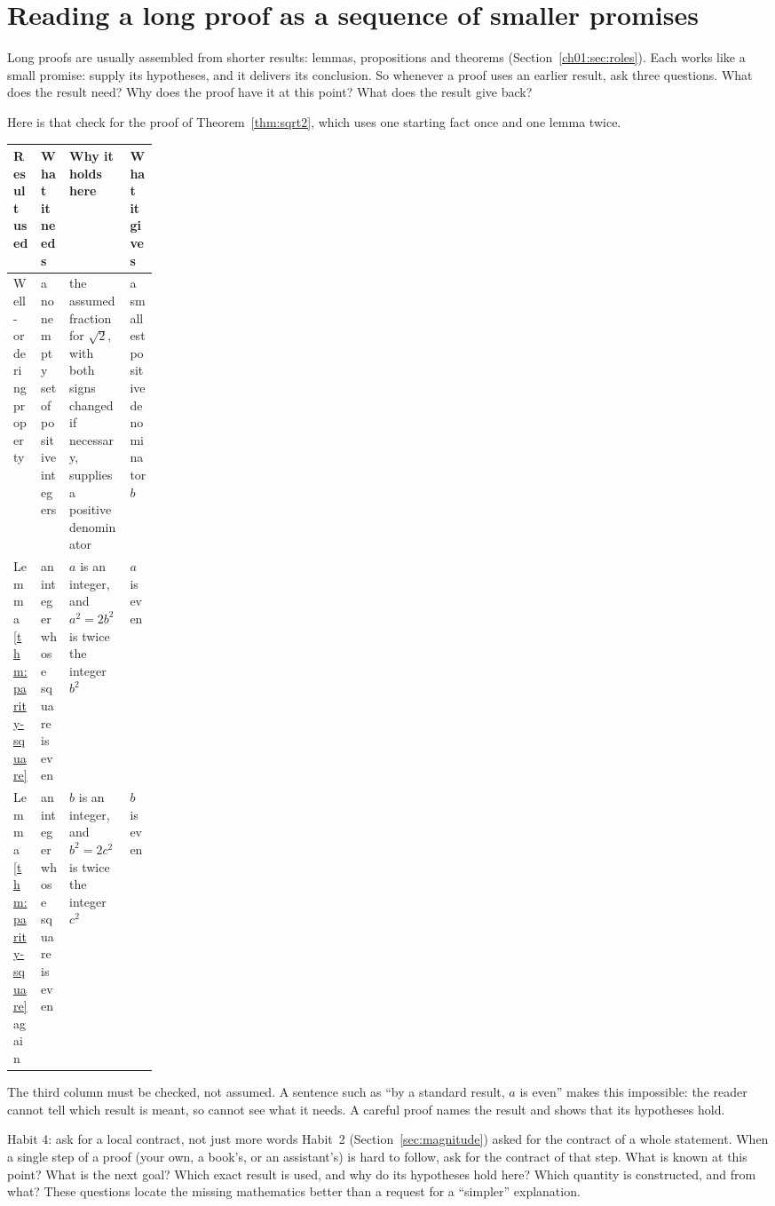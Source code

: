 \section{Reading a long proof as a sequence of smaller promises}\label{ch04:sec:promises}
Long proofs are usually assembled from shorter results: lemmas, propositions and theorems (Section~\ref{ch01:sec:roles}). Each works like a small promise: supply its hypotheses, and it delivers its conclusion. So whenever a proof uses an earlier result, ask three questions. What does the result need? Why does the proof have it at this point? What does the result give back?

Here is that check for the proof of Theorem~\ref{thm:sqrt2}, which uses one starting fact once and one lemma twice.
\begin{center}
\small
\begin{tabularx}{\linewidth}{@{}>{\raggedright\arraybackslash}p{0.19\linewidth}>{\raggedright\arraybackslash}X>{\raggedright\arraybackslash}X>{\raggedright\arraybackslash}X@{}}
\toprule
Result used & What it needs & Why it holds here & What it gives\\
\midrule
Well-ordering property & a nonempty set of positive integers & the assumed fraction for $\sqrt2$, with both signs changed if necessary, supplies a positive denominator & a smallest positive denominator $b$\\
Lemma~\ref{thm:parity-square} & an integer whose square is even & $a$ is an integer, and $a^2=2b^2$ is twice the integer $b^2$ & $a$ is even\\
Lemma~\ref{thm:parity-square} again & an integer whose square is even & $b$ is an integer, and $b^2=2c^2$ is twice the integer $c^2$ & $b$ is even\\
\bottomrule
\end{tabularx}
\end{center}
The third column must be checked, not assumed. A sentence such as ``by a standard result, $a$ is even'' makes this impossible: the reader cannot tell which result is meant, so cannot see what it needs. A careful proof names the result and shows that its hypotheses hold.

\begin{principle}{Habit 4: ask for a local contract, not just more words}
Habit~2 (Section~\ref{sec:magnitude}) asked for the contract of a whole statement. When a single step of a proof (your own, a book's, or an assistant's) is hard to follow, ask for the contract of that step. What is known at this point? What is the next goal? Which exact result is used, and why do its hypotheses hold here? Which quantity is constructed, and from what? These questions locate the missing mathematics better than a request for a ``simpler'' explanation.
\end{principle}

